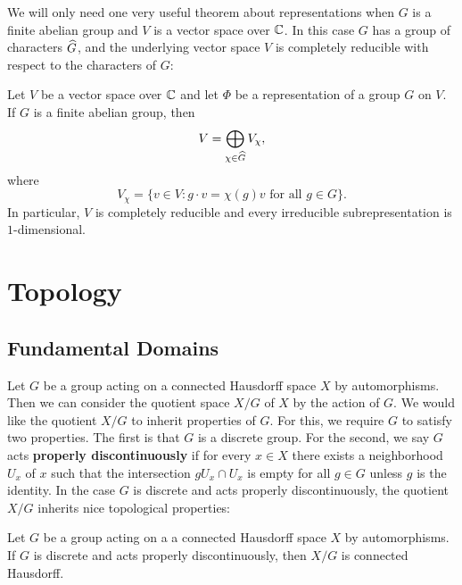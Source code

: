     We will only need one very useful theorem about representations when $G$ is a finite abelian group and $V$ is a vector space over $\mathbb{C}$. In this case $G$ has a group of characters $\widehat{G}$, and the underlying vector space $V$ is completely reducible with respect to the characters of $G$:

    \begin{theorem}\label{thm:finite_abelian_representation_is_completely_reducible}
      Let $V$ be a vector space over $\mathbb{C}$ and let $\Phi$ be a representation of a group $G$ on $V$. If $G$ is a finite abelian group, then
      \[
        V = \bigoplus_{\chi \in \widehat{G}}V_{\chi},
      \]
      where
      \[
        V_{\chi} = \{v \in V:g \cdot v = \chi(g)v \text{ for all } g \in G\}.
      \]
      In particular, $V$ is completely reducible and every irreducible subrepresentation is $1$-dimensional.
    \end{theorem}
\chapter{Topology}
  \section{Fundamental Domains}\label{append:Fundamental_Domains}
    Let $G$ be a group acting on a connected Hausdorff space $X$ by automorphisms. Then we can consider the quotient space $X/G$ of $X$ by the action of $G$. We would like the quotient $X/G$ to inherit properties of $G$. For this, we require $G$ to satisfy two properties. The first is that $G$ is a discrete group. For the second, we say $G$ acts \textbf{properly discontinuously} if for every $x \in X$ there exists a neighborhood $U_{x}$ of $x$ such that the intersection $gU_{x} \cap U_{x}$ is empty for all $g \in G$ unless $g$ is the identity. In the case $G$ is discrete and acts properly discontinuously, the quotient $X/G$ inherits nice topological properties:

    \begin{proposition}\label{prop:quotient_by_discrete_property_discontinuously}
      Let $G$ be a group acting on a a connected Hausdorff space $X$ by automorphisms. If $G$ is discrete and acts properly discontinuously, then $X/G$ is connected Hausdorff.
    \end{proposition}

